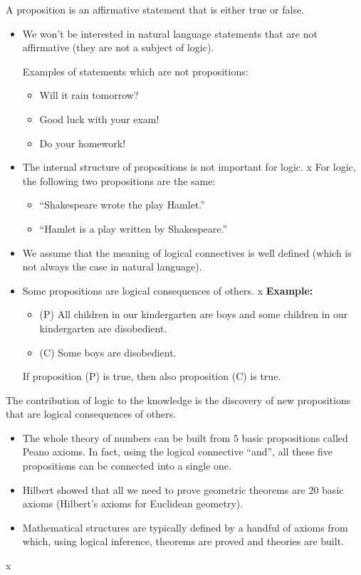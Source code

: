 \documentclass[11pt,paper=b5,footinclude,headinclude]{scrbook} %
\theoremstyle{remark}
\theoremstyle{definition} %
\theoremstyle{theorem} %
\begin{document}
A proposition is an affirmative statement that is either true or false.
\begin{itemize}
  \item We won't be interested in natural language statements that are not affirmative (they are not a subject of logic).

  Examples of statements which are not propositions: 
  \begin{itemize}
      \item Will it rain tomorrow? 
      \item Good luck with your exam! 
      \item Do your homework!
  \end{itemize}
  \item The internal structure of propositions is not important for logic.
x
  For logic, the following two propositions are the same:
  \begin{itemize}
    \item ``Shakespeare wrote the play Hamlet.''

    \item ``Hamlet is a play written by Shakespeare.''
  \end{itemize}
  \item We assume that the meaning of logical connectives is well defined (which is not always the case in natural language).
  \item 
  Some propositions are logical consequences of others.
  x
\textbf{Example:}
\begin{itemize}
  \item (P) All children in our kindergarten are boys and some children in our kindergarten are disobedient.
  \item (C) Some boys are disobedient.
\end{itemize}
If proposition (P) is true, then also proposition (C) is true.
\end{itemize}

The contribution of logic to the knowledge is the discovery of new propositions that are logical consequences of others.
\begin{itemize}
  \item The whole theory of numbers can be built from $5$ basic propositions called Peano axioms. In fact, using the logical connective ``and'', all these five propositions can be connected into a single one.
  \item Hilbert showed that all we need to prove geometric theorems are $20$ basic axioms (Hilbert's axioms for Euclidean geometry).
  \item Mathematical structures are typically defined by a handful of axioms from which, using logical inference, theorems are proved and theories are built.
\end{itemize}
x
\end{document}
